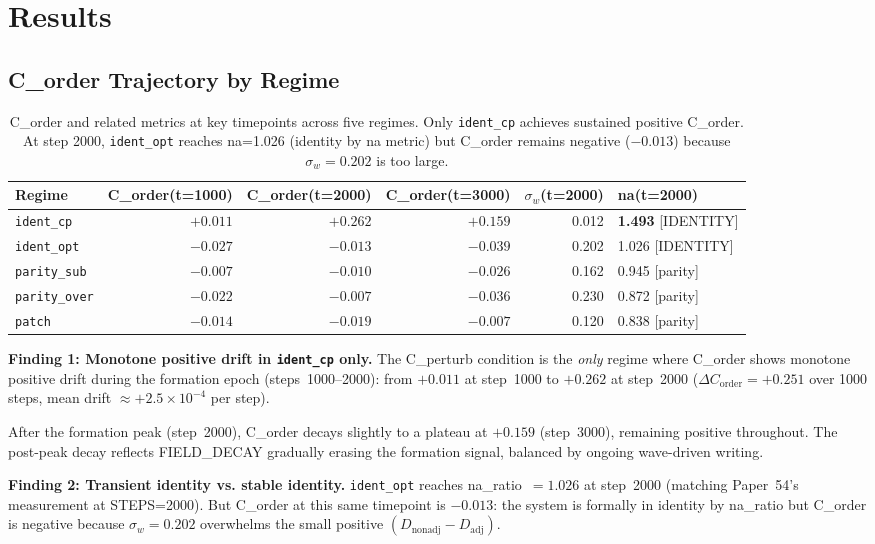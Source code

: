 \documentclass[11pt,a4paper]{article}
\begin{document}
\section{Results}

\subsection{C\_order Trajectory by Regime}

\begin{table}[h!]
\centering
\small
\begin{tabular}{lrrrrl}
\toprule
Regime & C\_order(t=1000) & C\_order(t=2000) & C\_order(t=3000) & $\sigma_w$(t=2000) & na(t=2000) \\
\midrule
\texttt{ident\_cp}   & $+0.011$ & $+0.262$ & $+0.159$ & 0.012 & \textbf{1.493} [IDENTITY] \\
\texttt{ident\_opt}  & $-0.027$ & $-0.013$ & $-0.039$ & 0.202 & 1.026 [IDENTITY] \\
\texttt{parity\_sub} & $-0.007$ & $-0.010$ & $-0.026$ & 0.162 & 0.945 [parity] \\
\texttt{parity\_over}& $-0.022$ & $-0.007$ & $-0.036$ & 0.230 & 0.872 [parity] \\
\texttt{patch}       & $-0.014$ & $-0.019$ & $-0.007$ & 0.120 & 0.838 [parity] \\
\bottomrule
\end{tabular}
\caption{C\_order and related metrics at key timepoints across five regimes.
Only \texttt{ident\_cp} achieves sustained positive C\_order.
At step 2000, \texttt{ident\_opt} reaches na=1.026 (identity by na metric) but
C\_order remains negative ($-0.013$) because $\sigma_w = 0.202$ is too large.}
\end{table}

\textbf{Finding 1: Monotone positive drift in \texttt{ident\_cp} only.}
The C\_perturb condition is the \emph{only} regime where C\_order shows monotone
positive drift during the formation epoch (steps~1000--2000):
from $+0.011$ at step~1000 to $+0.262$ at step~2000 ($\Delta C_\mathrm{order} = +0.251$
over 1000 steps, mean drift $\approx +2.5 \times 10^{-4}$ per step).

After the formation peak (step~2000), C\_order decays slightly to a plateau
at $+0.159$ (step~3000), remaining positive throughout.
The post-peak decay reflects FIELD\_DECAY gradually erasing the formation signal,
balanced by ongoing wave-driven writing.

\textbf{Finding 2: Transient identity vs. stable identity.}
\texttt{ident\_opt} reaches na\_ratio~$= 1.026$ at step~2000
(matching Paper~54's measurement at STEPS=2000).
But C\_order at this same timepoint is $-0.013$: the system is formally in
identity by na\_ratio but C\_order is negative because
$\sigma_w = 0.202$ overwhelms the small positive
$(D_\mathrm{nonadj} - D_\mathrm{adj})$.
\end{document}
